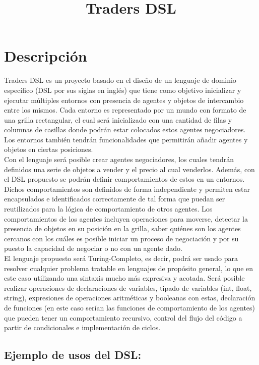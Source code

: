 \documentclass{article}
\begin{document}
\title{Traders DSL}

\section{Descripción}

Traders DSL es un proyecto basado en el diseño de un lenguaje de dominio específico (DSL por sus siglas en inglés) que tiene como objetivo inicializar y ejecutar múltiples entornos con presencia de agentes y objetos de intercambio entre los mismos. Cada entorno es representado por un mundo con formato de una grilla rectangular, el cual será inicializado con una cantidad de filas y columnas de casillas donde podrán estar colocados estos agentes negociadores. Los entornos también tendrán funcionalidades que permitirán añadir agentes y objetos en ciertas posiciones.  \\

Con el lenguaje será posible crear agentes negociadores, los cuales tendrán definidos una serie de objetos a vender y el precio al cual venderlos. Además, con el DSL propuesto se podrán definir comportamientos de estos en un entornos. Dichos comportamientos son definidos de forma independiente y permiten estar encapsulados e identificados correctamente de tal forma que puedan ser reutilizados para la lógica de comportamiento de otros agentes. Los comportamientos de los agentes incluyen operaciones para moverse, detectar la presencia de objetos en su posición en la grilla, saber quiénes son los agentes cercanos con los cuáles es posible iniciar un proceso de negociación y por su puesto la capacidad de negociar o no con un agente dado.  \\

El lenguaje propuesto será Turing-Completo, es decir, podrá ser usado para resolver cualquier problema tratable en lenguajes de propósito general, lo que en este caso utilizando una sintaxis mucho más expresiva y acotada. Será posible realizar operaciones de declaraciones de variables, tipado de variables (int, float, string), expresiones de operaciones aritméticas y booleanas con estas, declaración de funciones (en este caso serían las funciones de comportamiento de los agentes) que pueden tener un comportamiento recursivo, control del flujo del código a partir de condicionales e implementación de ciclos.  \\

\subsection{Ejemplo de usos del DSL:}
\end{document}
